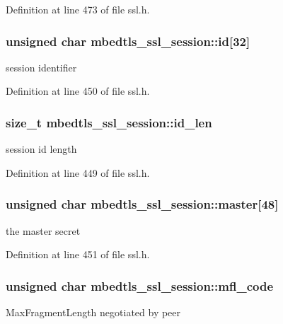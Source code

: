 Definition at line 473 of file ssl.\-h.

\hypertarget{structmbedtls__ssl__session_abd00d63c5fe4ae5dd87cbba60155fbc4}{
\subsubsection[{id}]{\setlength{\rightskip}{0pt plus 5cm}unsigned char mbedtls\-\_\-ssl\-\_\-session\-::id\mbox{[}32\mbox{]}}}\label{structmbedtls__ssl__session_abd00d63c5fe4ae5dd87cbba60155fbc4}
session identifier 

Definition at line 450 of file ssl.\-h.

\hypertarget{structmbedtls__ssl__session_ad1bc5443b7ac77eadd1df71a69f18ba6}{
\subsubsection[{id\-\_\-len}]{\setlength{\rightskip}{0pt plus 5cm}size\-\_\-t mbedtls\-\_\-ssl\-\_\-session\-::id\-\_\-len}}\label{structmbedtls__ssl__session_ad1bc5443b7ac77eadd1df71a69f18ba6}
session id length 

Definition at line 449 of file ssl.\-h.

\hypertarget{structmbedtls__ssl__session_ae8adb932e053a2179530a8aff8750624}{
\subsubsection[{master}]{\setlength{\rightskip}{0pt plus 5cm}unsigned char mbedtls\-\_\-ssl\-\_\-session\-::master\mbox{[}48\mbox{]}}}\label{structmbedtls__ssl__session_ae8adb932e053a2179530a8aff8750624}
the master secret 

Definition at line 451 of file ssl.\-h.

\hypertarget{structmbedtls__ssl__session_a9eb94cea53e9e6cb74e6f4204aee0a72}{
\subsubsection[{mfl\-\_\-code}]{\setlength{\rightskip}{0pt plus 5cm}unsigned char mbedtls\-\_\-ssl\-\_\-session\-::mfl\-\_\-code}}\label{structmbedtls__ssl__session_a9eb94cea53e9e6cb74e6f4204aee0a72}
Max\-Fragment\-Length negotiated by peer 

